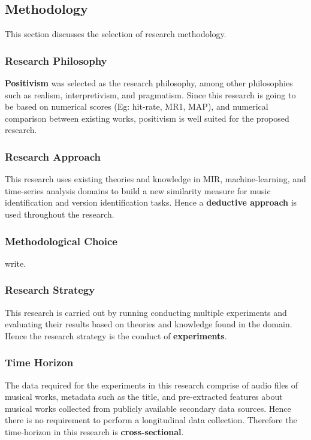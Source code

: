 \documentclass[../main.tex]{subfiles}
\begin{document}
\subsection{Methodology}

\par
This section discusses the selection of research methodology.

\subsubsection{Research Philosophy}
\textbf{Positivism} was selected as the research philosophy, among other philosophies such as realism, interpretivism, and pragmatism. Since this research is going to be based on numerical scores (Eg: hit-rate, \gls{MR1}, \gls{MAP}), and numerical comparison between existing works, positivism is well suited for the proposed research.

\subsubsection{Research Approach}
This research uses existing theories and knowledge in \gls{MIR}, machine-learning, and time-series analysis domains to build a new similarity measure for music identification and version identification tasks. Hence a \textbf{deductive approach} is used throughout the research.

\subsubsection{Methodological Choice}
write.


\subsubsection{Research Strategy}
This research is carried out by running conducting multiple experiments and evaluating their results based on theories and knowledge found in the domain. Hence the research strategy is the conduct of \textbf{experiments}.


\subsubsection{Time Horizon}
The data required for the experiments in this research comprise of audio files of musical works, metadata such as the title, and pre-extracted features about musical works collected from publicly available secondary data sources. Hence there is no requirement to perform a longitudinal data collection. Therefore the time-horizon in this research is \textbf{cross-sectional}.
\end{document}
